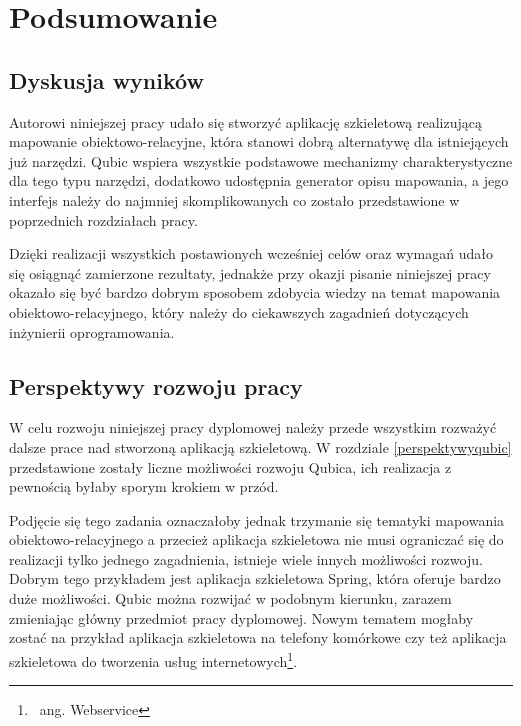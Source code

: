\documentclass[12pt]{report}
\begin{document}
\chapter{Podsumowanie} \label{podsumowanie}

\section{Dyskusja wyników}

Autorowi niniejszej pracy udało się stworzyć aplikację szkieletową realizującą ma\-powanie obiektowo-relacyjne, która stanowi dobrą alternatywę dla istniejących już narzędzi.
Qubic wspiera wszystkie podstawowe mechanizmy charakterystyczne dla tego typu narzędzi, dodatkowo udostępnia generator opisu mapowania, a jego interfejs należy do
najmniej skomplikowanych co zostało przedstawione w poprzednich rozdziałach pracy.

Dzięki realizacji wszystkich postawionych wcześniej celów oraz wymagań udało się osiągnąć zamierzone rezultaty, jednakże przy okazji pisanie niniejszej pracy okazało się
być bardzo dobrym sposobem zdobycia wiedzy na temat mapowania obiektowo-relacyjnego, który należy do ciekawszych zagadnień dotyczących inżynierii oprogramowania.

\section{Perspektywy rozwoju pracy}

W celu rozwoju niniejszej pracy dyplomowej należy przede wszystkim rozważyć dalsze prace nad stworzoną aplikacją szkieletową. W rozdziale \ref{perspektywyqubic} przedstawione
zostały liczne możliwości rozwoju Qubica, ich realizacja z pewnością byłaby sporym krokiem w przód.

Podjęcie się tego zadania oznaczałoby jednak trzymanie się tematyki mapowania obiektowo-relacyjnego a przecież aplikacja szkieletowa nie musi ograniczać się do realizacji
tylko jednego zagadnienia, istnieje wiele innych możliwości rozwoju. Dobrym tego przykładem jest aplikacja szkieletowa Spring, która oferuje bardzo duże możliwości. Qubic 
można rozwijać w podobnym kierunku, zarazem zmieniając główny przedmiot pracy dyplomowej. Nowym tematem mogłaby zostać na przykład aplikacja szkieletowa na telefony
komórkowe czy też aplikacja szkieletowa do tworzenia usług internetowych\footnote{~ang. Webservice}.
\end{document}
